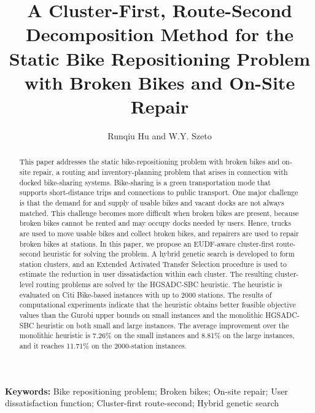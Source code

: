 
\title{A Cluster-First, Route-Second Decomposition Method for the Static Bike Repositioning Problem with Broken Bikes and On-Site Repair}
\author{Runqiu Hu and W.Y. Szeto}

\begin{abstract}
This paper addresses the static bike-repositioning problem with broken bikes
and on-site repair, a routing and inventory-planning problem that arises in
connection with docked bike-sharing systems. Bike-sharing is a green
transportation mode that supports short-distance trips and connections to
public transport. One major challenge is that the demand for and supply of
usable bikes and vacant docks are not always matched. This challenge becomes
more difficult when broken bikes are present, because broken bikes cannot be
rented and may occupy docks needed by users. Hence, trucks are used to move
usable bikes and collect broken bikes, and repairers are used to repair broken
bikes at stations. In this paper, we propose an EUDF-aware cluster-first
route-second heuristic for solving the problem. A hybrid genetic search is
developed to form station clusters, and an Extended Activated Transfer
Selection procedure is used to estimate the reduction in user dissatisfaction
within each cluster. The resulting cluster-level routing problems are solved by
the HGSADC-SBC heuristic. The heuristic is evaluated on Citi Bike-based
instances with up to 2000 stations. The results of computational experiments
indicate that the heuristic obtains better feasible objective values than the
Gurobi upper bounds on small instances and the monolithic HGSADC-SBC heuristic
on both small and large instances. The average improvement over the monolithic
heuristic is 7.26\% on the small instances and 8.81\% on the large instances,
and it reaches 11.71\% on the 2000-station instances.
\end{abstract}

\noindent\textbf{Keywords:} Bike repositioning problem; Broken bikes; On-site repair; User dissatisfaction function; Cluster-first route-second; Hybrid genetic search

